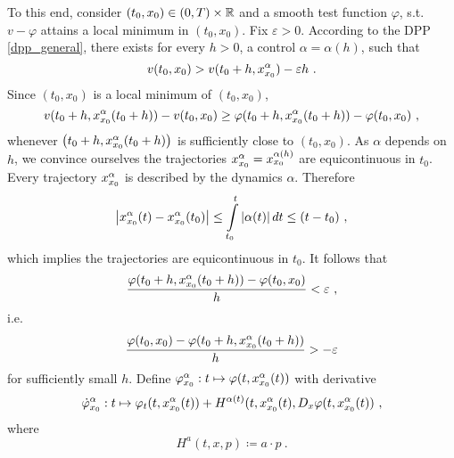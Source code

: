 \begin{example}
	To this end, consider $ (t_0, x_0) \in \left(0, T\right) \times \mathbb{R} $ and a smooth test function $ \varphi $, s.t. $ v - \varphi $ attains a local minimum in $ (t_0, x_0) $. Fix $ \varepsilon > 0 $. According to the DPP \eqref{dpp_general}, there exists for every $ h > 0 $, a control $ \alpha = \alpha(h) $, such that
	\begin{equation*}
		v(t_0, x_0) > v(t_0 + h, x_{x_0}^{\alpha}) - \varepsilon h \ .
	\end{equation*}
	Since $ (t_0, x_0) $ is a local minimum of $ (t_0, x_0) $,
	\begin{equation*}
		v(t_0 + h, \simpleTrajectory{x_0}{\alpha}(t_0  + h)) - v(t_0, x_0) \geq \varphi(t_0 + h, \simpleTrajectory{x_0}{\alpha}(t_0  + h)) - \varphi(t_0, x_0) \ ,
	\end{equation*}
	whenever $ \left(t_0 + h, x_{x_0}^{\alpha}(t_0  + h)\right) $ is sufficiently close to $ (t_0, x_0) $. As $ \alpha $ depends on $ h $, we convince ourselves the trajectories $ x_{x_0}^{\alpha} = x_{x_0}^{\alpha(h)} $ are equicontinuous in $ t_0 $. Every trajectory $ x_{x_0}^{\alpha} $ is described by the dynamics $ \alpha $. Therefore
	\begin{equation*}
		\left\lvert {x_{x_0}^{\alpha}(t) - x_{x_0}^{\alpha}(t_0)} \right\rvert \leq \int\limits_{t_0}^{t} \left\lvert {\alpha(t)} \right\rvert dt \leq (t - t_0) \ ,
	\end{equation*}
	which implies the trajectories are equicontinuous in $ t_0 $. It follows that
	\begin{equation*}
		\frac{\varphi(t_0 + h, x_{x_0}^{\alpha}(t_0 + h)) - \varphi(t_0, x_0)}{h} < \varepsilon \ ,
	\end{equation*}
	i.e.
	\begin{equation*}
		\frac{\varphi(t_0, x_0) - \varphi(t_0 + h, x_{x_0}^{\alpha}(t_0 + h))}{h} > -\varepsilon
	\end{equation*}
	for sufficiently small $ h $. Define $ \varphi_{x_0}^{\alpha} : t \mapsto \varphi(t, x_{x_0}^{\alpha}(t)) $ with derivative
	\begin{equation*}
		\dot{\varphi}_{x_0}^{\alpha} : t \mapsto \varphi_t(t, x_{x_0}^{\alpha}(t)) + H^{\alpha(t)}(t, x_{x_0}^{\alpha}(t), D_x \varphi(t, x_{x_0}^{\alpha}(t)) \ ,
	\end{equation*}
	where
	\begin{equation*}
		H^a (t, x, p) \coloneqq a \cdot p \ .

\end{equation*}
\end{example}
